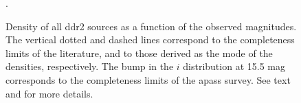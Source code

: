 \begin{figure}[ht!]
\begin{center}
\caption{Density of all \gls{ddr2} sources as a function of the observed magnitudes. The vertical dotted and dashed lines correspond to the completeness limits of the literature, and to those derived as the mode of the densities, respectively. The bump in the $i$ distribution at 15.5 mag corresponds to the completeness limits of the \gls{apass} survey.  See text and \citet{Bouy2015} for more details.}
\label{fig:completeness}.
\end{center}
\end{figure}

%

